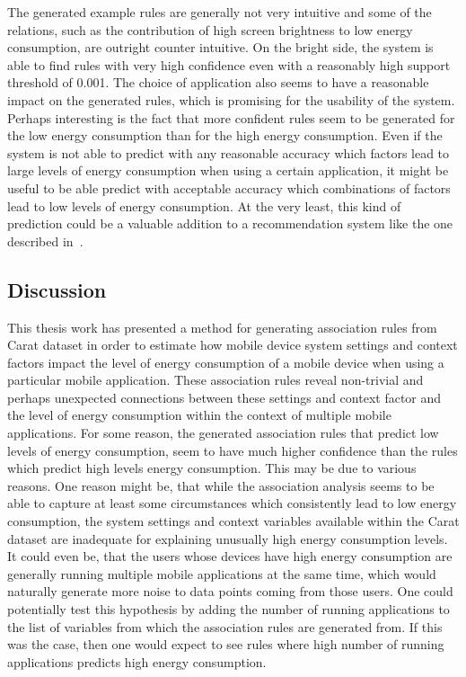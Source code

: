 The generated example rules are generally not very intuitive and some of the relations, such as the contribution of high screen brightness to low energy consumption, are outright counter intuitive. On the bright side, the system is able to find rules with very high confidence even with a reasonably high support threshold of 0.001. The choice of application also seems to have a reasonable impact on the generated rules, which is promising for the usability of the system. Perhaps interesting is the fact that more confident rules seem to be generated for the low energy consumption than for the high energy consumption. Even if the system is not able to predict with any reasonable accuracy which factors lead to large levels of energy consumption when using a certain application, it might be useful to be able predict with acceptable accuracy which combinations of factors lead to low levels of energy consumption. At the very least, this kind of prediction could be a valuable addition to a recommendation system like the one described in~\cite{PELTONEN201671}.

\subsection{Discussion}

This thesis work has presented a method for generating association rules from Carat dataset in order to estimate how mobile device system settings and context factors impact the level of energy consumption of a mobile device when using a particular mobile application. These association rules reveal non-trivial and perhaps unexpected connections between these settings and context factor and the level of energy consumption within the context of multiple mobile applications. For some reason, the generated association rules that predict low levels of energy consumption, seem to have much higher confidence than the rules which predict high levels energy consumption. This may be due to various reasons. One reason might be, that while the association analysis seems to be able to capture at least some circumstances which consistently lead to low energy consumption, the system settings and context variables available within the Carat dataset are inadequate for explaining unusually high energy consumption levels. It could even be, that the users whose devices have high energy consumption are generally running multiple mobile applications at the same time, which would naturally generate more noise to data points coming from those users. One could potentially test this hypothesis by adding the number of running applications to the list of variables from which the association rules are generated from. If this was the case, then one would expect to see rules where high number of running applications predicts high energy consumption. 

